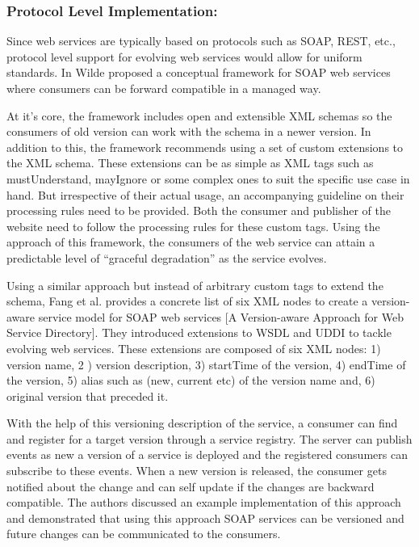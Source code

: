 \documentclass[runningheads,a4paper]{llncs}
\begin{document}
\subsubsection{Protocol Level Implementation:}
Since web services are typically based on protocols such as SOAP, REST, etc., protocol level support for evolving web services would allow for uniform standards. In \cite{wilde2004semantically} Wilde proposed a conceptual framework for SOAP web services where consumers can be forward compatible in a managed way.

At it’s core, the framework includes open and extensible XML schemas so the consumers of old version can work with the schema in a newer version. In addition to this, the framework recommends using a set of custom extensions to the XML schema. These extensions can be as simple as XML tags such as mustUnderstand, mayIgnore or some complex ones to suit the specific use case in hand. But irrespective of their actual usage, an accompanying guideline on their processing rules need to be provided. Both the consumer and publisher of the website need to follow the processing rules for these custom tags. Using the approach of this framework, the consumers of the web service can attain a predictable level of ``graceful degradation'' as the service evolves.

Using a similar approach but instead of arbitrary custom tags to extend the schema, Fang et al. provides a concrete list of six XML nodes to create a version-aware service model for SOAP web services [A Version-aware Approach for Web Service Directory]. They introduced extensions to WSDL and UDDI to tackle evolving web services. These extensions are composed of six XML nodes: 1) version name, 2 ) version description, 3) startTime of the version, 4) endTime of the version, 5) alias such as (new, current etc) of the version name and, 6) original version that preceded it.

With the help of this versioning description of the service, a consumer can find and register for a target version through a service registry. The server can publish events as new a version of a service is deployed and the registered consumers can subscribe to these events. When a new version is released, the consumer gets notified about the change and can self update if the changes are backward compatible. The authors discussed an example implementation of this approach and demonstrated that using this approach SOAP services can be versioned and future changes can be communicated to the consumers.
\end{document}
